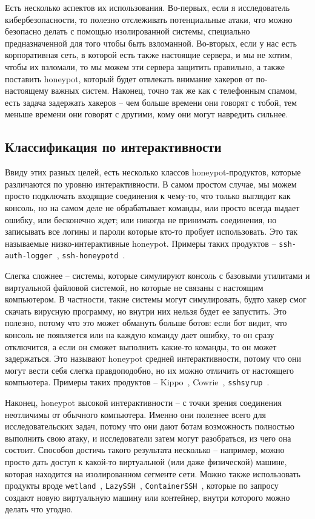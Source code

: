 \documentclass[a4page]{article}
\begin{document}
Есть несколько аспектов их использования. Во-первых, если я исследователь кибербезопасности, то полезно отслеживать потенциальные атаки, что можно безопасно делать с помощью изолированной системы, специально предназначенной для того чтобы быть взломанной. Во-вторых, если у нас есть корпоративная сеть, в которой есть также настоящие сервера, и мы не хотим, чтобы их взломали, то мы можем эти сервера защитить правильно, а также поставить honeypot, который будет отвлекать внимание хакеров от по-настоящему важных систем. Наконец, точно так же как с телефонным спамом, есть задача задержать хакеров – чем больше времени они говорят с тобой, тем меньше времени они говорят с другими, кому они могут навредить сильнее.

\subsection{Классификация по интерактивности}
Ввиду этих разных целей, есть несколько классов honeypot-продуктов, которые различаются по уровню интерактивности. В самом простом случае, мы можем просто подключать входящие соединения к чему-то, что только выглядит как консоль, но на самом деле не обрабатывает команды, или просто всегда выдает ошибку, или бесконечно ждет; или никогда не принимать соединения, но записывать все логины и пароли которые кто-то пробует использовать.  Это так называемые низко-интерактивные honeypot. Примеры таких продуктов -- \texttt{ssh-auth-logger}~\cite{ssh-auth-logger}, \texttt{ssh-honeypotd}~\cite{ssh-honeypotd}.

Слегка сложнее – системы, которые симулируют консоль с базовыми утилитами и виртуальной файловой системой, но которые не связаны с настоящим компьютером. В частности, такие системы могут симулировать, будто хакер смог скачать вирусную программу, но внутри них нельзя будет ее запустить. Это полезно, потому что это может обмануть больше ботов: если бот видит, что консоль не появляется или на каждую команду дает ошибку, то он сразу отключится, а если он сможет выполнить какие-то команды, то он может задержаться. Это называют honeypot средней интерактивности, потому что они могут вести себя слегка правдоподобно, но их можно отличить от настоящего компьютера. Примеры таких продуктов – Kippo~\cite{kippo}, Cowrie~\cite{cowrie}, \texttt{sshsyrup}~\cite{sshsyrup}.

Наконец, honeypot высокой интерактивности – с точки зрения соединения неотличимы от обычного компьютера. Именно они полезнее всего для исследовательских задач, потому что они дают ботам возможность полностью выполнить свою атаку, и исследователи затем могут разобраться, из чего она состоит. Способов достичь такого результата несколько – например, можно просто дать доступ к какой-то виртуальной (или даже физической) машине, которая находится на изолированном сегменте сети. Можно также использовать продукты вроде \texttt{wetland}~\cite{wetland}, \texttt{LazySSH}~\cite{lazyssh}, \texttt{ContainerSSH}~\cite{containerssh}, которые по запросу создают новую виртуальную машину или контейнер, внутри которого можно делать что угодно.
\end{document}
